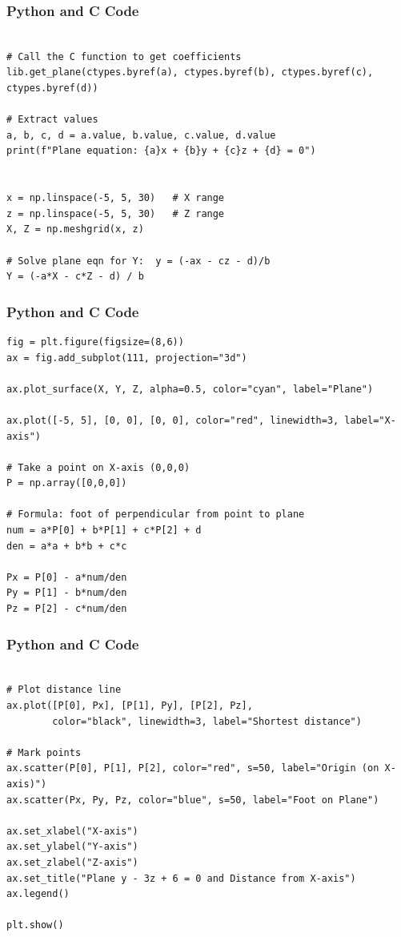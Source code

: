 \documentclass{beamer}
\begin{document}
\begin{frame}[fragile]
\frametitle{Python and C Code}

\begin{lstlisting}

# Call the C function to get coefficients
lib.get_plane(ctypes.byref(a), ctypes.byref(b), ctypes.byref(c), ctypes.byref(d))

# Extract values
a, b, c, d = a.value, b.value, c.value, d.value
print(f"Plane equation: {a}x + {b}y + {c}z + {d} = 0")


x = np.linspace(-5, 5, 30)   # X range
z = np.linspace(-5, 5, 30)   # Z range
X, Z = np.meshgrid(x, z)

# Solve plane eqn for Y:  y = (-ax - cz - d)/b
Y = (-a*X - c*Z - d) / b

\end{lstlisting}

\end{frame}

\begin{frame}[fragile]
\frametitle{Python and C Code}

\begin{lstlisting}
fig = plt.figure(figsize=(8,6))
ax = fig.add_subplot(111, projection="3d")

ax.plot_surface(X, Y, Z, alpha=0.5, color="cyan", label="Plane")

ax.plot([-5, 5], [0, 0], [0, 0], color="red", linewidth=3, label="X-axis")

# Take a point on X-axis (0,0,0)
P = np.array([0,0,0])

# Formula: foot of perpendicular from point to plane
num = a*P[0] + b*P[1] + c*P[2] + d
den = a*a + b*b + c*c

Px = P[0] - a*num/den
Py = P[1] - b*num/den
Pz = P[2] - c*num/den
\end{lstlisting}

\end{frame}

\begin{frame}[fragile]
\frametitle{Python and C Code}

\begin{lstlisting}

# Plot distance line
ax.plot([P[0], Px], [P[1], Py], [P[2], Pz],
        color="black", linewidth=3, label="Shortest distance")

# Mark points
ax.scatter(P[0], P[1], P[2], color="red", s=50, label="Origin (on X-axis)")
ax.scatter(Px, Py, Pz, color="blue", s=50, label="Foot on Plane")

ax.set_xlabel("X-axis")
ax.set_ylabel("Y-axis")
ax.set_zlabel("Z-axis")
ax.set_title("Plane y - 3z + 6 = 0 and Distance from X-axis")
ax.legend()

plt.show()
\end{lstlisting}

\end{frame}
\end{document}
